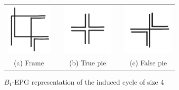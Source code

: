 

\begin{figure}[htb]
  \centering
  \begin{tabular}{c c c c c }
    \includegraphics[width=2.3cm]{./img/representacaociclotam41.png}  
    & &\includegraphics[width=2.5cm]{./img/representacaociclotam42.png} 
    & &
 \includegraphics[width=2.5cm]{./img/representacaociclotam43.png} \\%
    {\footnotesize (a) Frame}  & &  {\footnotesize (b) True pie} & & {\footnotesize (c) False pie} %
  \end{tabular}
  \caption{$B_{1}$-EPG representation of the induced cycle of size 4}\label{fig:ciclotam4}
\end{figure} 